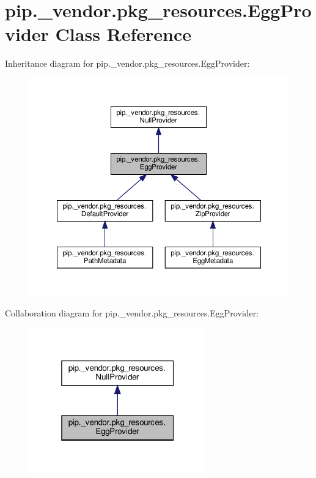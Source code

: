 \hypertarget{classpip_1_1__vendor_1_1pkg__resources_1_1EggProvider}{}\section{pip.\+\_\+vendor.\+pkg\+\_\+resources.\+Egg\+Provider Class Reference}
\label{classpip_1_1__vendor_1_1pkg__resources_1_1EggProvider}


Inheritance diagram for pip.\+\_\+vendor.\+pkg\+\_\+resources.\+Egg\+Provider\+:
\nopagebreak
\begin{figure}[H]
\begin{center}
\leavevmode
\includegraphics[width=350pt]{classpip_1_1__vendor_1_1pkg__resources_1_1EggProvider__inherit__graph}
\end{center}
\end{figure}


Collaboration diagram for pip.\+\_\+vendor.\+pkg\+\_\+resources.\+Egg\+Provider\+:
\nopagebreak
\begin{figure}[H]
\begin{center}
\leavevmode
\includegraphics[width=217pt]{classpip_1_1__vendor_1_1pkg__resources_1_1EggProvider__coll__graph}
\end{center}
\end{figure}
